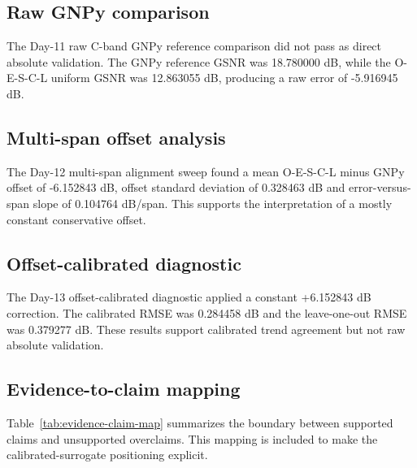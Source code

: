 ﻿\documentclass[pdflatex,sn-mathphys-num]{sn-jnl}
\begin{document}
\subsection{Raw GNPy comparison}

The Day-11 raw C-band GNPy reference comparison did not pass as direct absolute validation. The GNPy reference GSNR was 18.780000 dB, while the O-E-S-C-L uniform GSNR was 12.863055 dB, producing a raw error of -5.916945 dB.

\subsection{Multi-span offset analysis}

The Day-12 multi-span alignment sweep found a mean O-E-S-C-L minus GNPy offset of -6.152843 dB, offset standard deviation of 0.328463 dB and error-versus-span slope of 0.104764 dB/span. This supports the interpretation of a mostly constant conservative offset.

\subsection{Offset-calibrated diagnostic}

The Day-13 offset-calibrated diagnostic applied a constant +6.152843 dB correction. The calibrated RMSE was 0.284458 dB and the leave-one-out RMSE was 0.379277 dB. These results support calibrated trend agreement but not raw absolute validation.



\subsection{Evidence-to-claim mapping}

Table~\ref{tab:evidence-claim-map} summarizes the boundary between supported claims and unsupported overclaims. This mapping is included to make the calibrated-surrogate positioning explicit.
\end{document}
